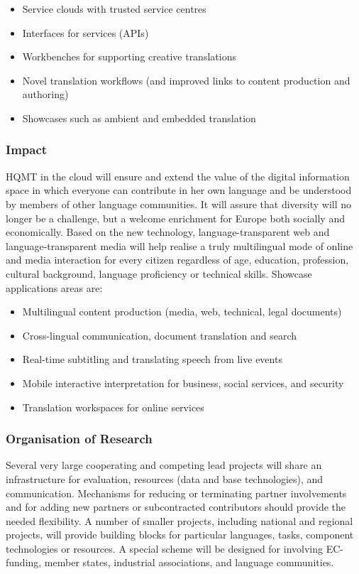 \documentclass[10pt, plain]{../../metanetpaper}
\begin{document}
\begin{multicols}{2}
\begin{itemize}
\item Service clouds with trusted service centres
\item Interfaces for services (APIs)
\item Workbenches for supporting creative translations
\item Novel translation workflows (and improved links to content production and authoring)
\item Showcases such as ambient and embedded translation
\end{itemize}

\subsubsection{Impact}
\label{sec:impact-pt1}

HQMT in the cloud will ensure and extend the value of the digital information space in which everyone can contribute in her own language and be understood by members of other language communities. It will assure that diversity will no longer be a challenge, but a welcome enrichment for Europe both socially and economically. Based on the new technology, language-transparent web and language-transparent media will help realise a truly multilingual mode of online and media interaction for every citizen regardless of age, education, profession, cultural background, language proficiency or technical skills. Showcase applications areas are:

\begin{itemize}
\item Multilingual content production (media, web, technical, legal documents)
\item Cross-lingual communication, document translation and search
\item Real-time subtitling and translating speech from live events
\item Mobile interactive interpretation for business, social services, and security
\item Translation workspaces for online services
\end{itemize}

\subsubsection{Organisation of Research}
\label{sec:organ-rese-pt1}

Several very large cooperating and competing lead projects will share an infrastructure for evaluation, resources (data and base technologies), and communication. Mechanisms for reducing or terminating partner involvements and for adding new partners or subcontracted contributors should provide the needed flexibility. A number of smaller projects, including national and regional projects, will provide building blocks for particular languages, tasks, component technologies or resources. A special scheme will be designed for involving EC-funding, member states, industrial associations, and language communities.
 

\end{multicols}
\end{document}
